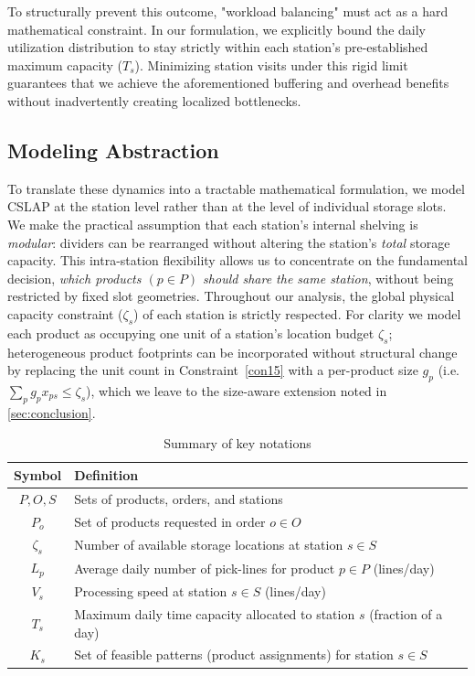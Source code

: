 \documentclass[preprint,review,11pt,authoryear]{elsarticle}
\begin{document}
To structurally prevent this outcome, "workload balancing" must act as a hard mathematical constraint. In our formulation, we explicitly bound the daily utilization distribution to stay strictly within each station's pre-established maximum capacity ($T_s$). Minimizing station visits under this rigid limit guarantees that we achieve the aforementioned buffering and overhead benefits without inadvertently creating localized bottlenecks.

\subsection{Modeling Abstraction}
To translate these dynamics into a tractable mathematical formulation, we model CSLAP at the station level rather than at the level of individual storage slots. We make the practical assumption that each station’s internal shelving is \emph{modular}: dividers can be rearranged without altering the station’s \emph{total} storage capacity. This intra-station flexibility allows us to concentrate on the fundamental decision, \emph{which products $(p \in P)$ should share the same station}, without being restricted by fixed slot geometries. Throughout our analysis, the global physical capacity constraint ($\zeta_s$) of each station is strictly respected. For clarity we model each product as occupying one unit of a station's location budget $\zeta_s$; heterogeneous product footprints can be incorporated without structural change by replacing the unit count in Constraint~\eqref{con15} with a per-product size $g_p$ (i.e. $\sum_{p} g_p x_{ps} \le \zeta_s$), which we leave to the size-aware extension noted in \cref{sec:conclusion}.


\begin{table}[H]
\centering
\small 
\begin{tabular}{cl}
\toprule
\textbf{Symbol} & \textbf{Definition}\\
\midrule
$P, O, S$ & Sets of products, orders, and stations\\
$P_o$ & Set of products requested in order $o \in O$\\
$\zeta_s$ & Number of available storage locations at station $s \in S$\\
$L_p$ & Average daily number of pick-lines for product $p \in P$ (lines/day)\\
$V_s$ & Processing speed at station $s \in S$ (lines/day)\\
$T_s$ & Maximum daily time capacity allocated to station $s$ (fraction of a day)\\
$K_s$ & Set of feasible patterns (product assignments) for station $s \in S$\\
\bottomrule
\end{tabular}
\caption*{Summary of key notations}
\label{tab:notation}
\end{table}
\end{document}
